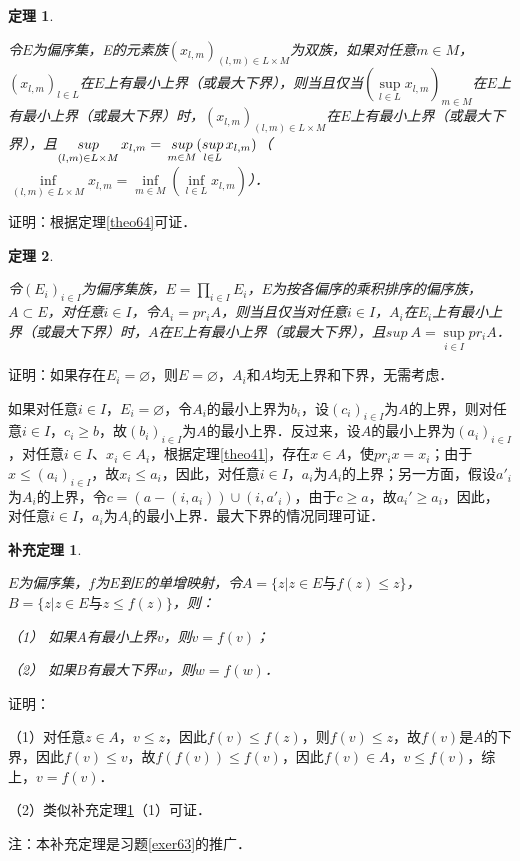 \documentclass[12pt, a4paper, oneside]{book}
\newtheorem{theo}{定理}
\newtheorem{cor}{补充定理}
\begin{document}
			\begin{theo}\label{theo65}
				\hfill\par
				令$E$为偏序集，E的元素族$(x_{l,m})_{(l, m)\in L\times M}$为双族，如果对任意$m\in M$，$(x_{l,m})_{l\in L}$在$E$上有最小上界（或最大下界），则当且仅当$(\mathop{sup}\limits_{l\in L}x_{l,m})_{m\in M}$在$E$上有最小上界（或最大下界）时，$(x_{l,m})_{(l, m)\in L\times M}$在$E$上有最小上界（或最大下界），且$\mathop{sup}\limits_{(l, m)\in L\times M}x_{l,m}=\\\mathop{sup}\limits_{m\in M}(\mathop{sup}\limits_{l\in L}x_{l,m})$（$\mathop{inf}\limits_{(l, m)\in L\times M}x_{l,m}=\mathop{inf}\limits_{m\in M}(\mathop{inf}\limits_{l\in L}x_{l,m})$）．
			\end{theo}
			证明：根据定理\ref{theo64}可证．
			
			\begin{theo}\label{theo66}
				\hfill\par
				令$(E_i)_{i\in I}$为偏序集族，$E=\prod\limits_{i\in I}E_i$，$E$为按各偏序的乘积排序的偏序族，$A\subset E$，对任意$i\in I$，令$A_i=pr_iA$，则当且仅当对任意$i\in I$，$A_i$在$E_i$上有最小上界（或最大下界）时，$A$在$E$上有最小上界（或最大下界），且$sup\ A=\mathop{sup}\limits_{i\in I}pr_iA$．
			\end{theo}
			证明：如果存在$E_i=\varnothing$，则$E=\varnothing$，$A_i$和$A$均无上界和下界，无需考虑．
			\par
			如果对任意$i\in I$，$E_i=\varnothing$，令$A_i$的最小上界为$b_i$，设$(c_i)_{i\in I}$为$A$的上界，则对任意$i\in I$，$c_i\geq b$，故$(b_i)_{i\in I}$为$A$的最小上界．反过来，设$A$的最小上界为$(a_i)_{i\in I}$，对任意$i\in I$、$x_i\in A_i$，根据定理\ref{theo41}，存在$x\in A$，使$pr_ix=x_i$；由于$x\leq (a_i)_{i\in I}$，故$x_i\leq a_i$，因此，对任意$i\in I$，$a_i$为$A_i$的上界；另一方面，假设${a'}_i$为$A_i$的上界，令$c=(a-(i, a_i))\cup (i, {a'}_i)$，由于$c\geq a$，故$a_i'\geq a_i$，因此，对任意$i\in I$，$a_i$为$A_i$的最小上界．最大下界的情况同理可证．

			\begin{cor}\label{cor185}
				\hfill\par
				$E$为偏序集，$f$为$E$到$E$的单增映射，令$A=\{z|z\in E\text{与}f(z)\leq z\}$，$B=\{z|z\in E\text{与}z\leq f(z)\}$，则：
				\par
				（1）	如果$A$有最小上界$v$，则$v=f(v)$；
				\par
				（2）	如果$B$有最大下界$w$，则$w=f(w)$．
			\end{cor}
			证明：
			\par
			（1）对任意$z\in A$，$v\leq z$，因此$f(v)\leq f(z)$，则$f(v)\leq z$，故$f(v)$是$A$的下界，因此$f(v)\leq v$，故$f(f(v))\leq f(v)$，因此$f(v)\in A$，$v\leq f(v)$，综上，$v=f(v)$．
			\par
			（2）类似补充定理\ref{cor185}（1）可证．
			\par
			注：本补充定理是习题\ref{exer63}的推广．
			
\end{document}

